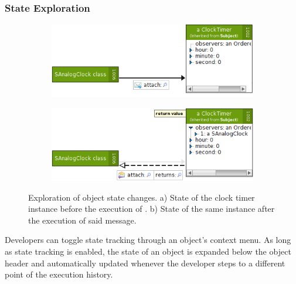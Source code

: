 \subsubsection{State Exploration}

\begin{figure}[b]
	\centering
	
	\begin{subfigure}{0.45\textwidth}
		\centering
		\includegraphics[width=\textwidth]{../images/04-ImplExplorationState1}
		\caption[Object State Before Message Execution]{}
		\label{fig:ImplementationExplorationState1}
	\end{subfigure}
	\quad
	\begin{subfigure}{0.45\textwidth}
		\centering
		\includegraphics[width=\textwidth]{../images/04-ImplExplorationState2}
		\caption[Object State After Message Execution]{}
		\label{fig:ImplementationExplorationState2}
	\end{subfigure}
	
	\caption[Exploration of Object State Changes]{Exploration of object state changes. a) State of the clock timer instance before the execution of . b) State of the same instance after the execution of said message.}
	\label{fig:ImplementationExplorationState}
\end{figure}

Developers can toggle state tracking through an object's context menu.
As long as state tracking is enabled, the state of an object is expanded below the object header and automatically updated whenever the developer steps to a different point of the execution history.

